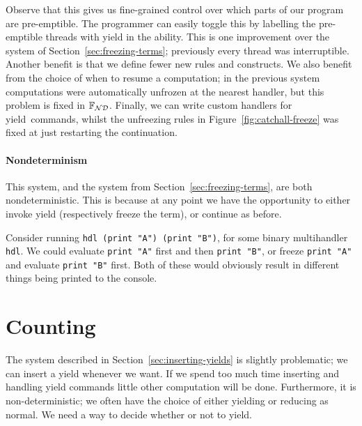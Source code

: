\documentclass[msc,deptreport,cs]{infthesis} %
\newcommand{\code}[1]{\lstinline{#1}}
\newcommand\nondetfrank{$\mathbb{F}_{\cal{ND}}$}
\newcommand\yield{\textsf{yield}\xspace}
\newcommand{\todo}[1]
           {{\par\noindent\small\color{RoyalPurple}
  \framebox{\parbox{\dimexpr\linewidth-2\fboxsep-2\fboxrule}
    {\textbf{TODO:} #1}}}}
\begin{document}
Observe that this gives us fine-grained control over which parts of our program
are pre-emptible.
The programmer can easily toggle this by labelling the pre-emptible threads with
\yield in the ability. This is one improvement over the system of
Section~\ref{sec:freezing-terms}; previously every thread was interruptible.
Another benefit is that we define fewer new rules and constructs. We also
benefit from the choice of when to resume a computation; in the previous system
computations were automatically unfrozen at the nearest handler, but this
problem is fixed in \nondetfrank. Finally, we can write custom handlers for
\yield~commands, whilst the unfreezing rules in Figure~\ref{fig:catchall-freeze}
was fixed at just restarting the continuation.


\paragraph*{Nondeterminism}

This system, and the system from Section~\ref{sec:freezing-terms}, are both
nondeterministic. This is because at any point we have the opportunity to either
invoke yield (respectively freeze the term), or continue as before.

Consider running \code{hdl (print "A") (print "B")}, for some binary
multihandler \code{hdl}. We could evaluate
\code{print "A"} first and then \code{print "B"}, or freeze \code{print "A"} and
evaluate \code{print "B"} first. Both of these would obviously result in
different things being printed to the console.

\section{Counting}
\label{sec:counting}



The system described in Section~\ref{sec:inserting-yields} is slightly
problematic; we can insert a \yield whenever we want. If we spend too much time
inserting and handling \yield commands little other computation will be done.
Furthermore, it is non-deterministic; we often have the choice of either
\yield{}ing or reducing as normal. We need a way to decide whether or not to
\yield.
\end{document}
